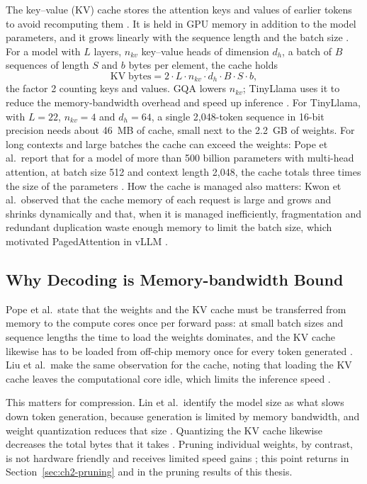 \documentclass[
11pt, %
english, %
singlespacing, %
headsepline, %
]{MastersDoctoralThesis} %
\begin{document}
The key--value (KV) cache stores the attention keys and values of earlier tokens to avoid recomputing them \cite{liu2024kivi}. It is held in GPU memory in addition to the model parameters, and it grows linearly with the sequence length and the batch size \cite{zhang2023h2o}. For a model with $L$ layers, $n_{kv}$ key--value heads of dimension $d_h$, a batch of $B$ sequences of length $S$ and $b$ bytes per element, the cache holds
\begin{equation}
  \mathrm{KV\;bytes} = 2 \cdot L \cdot n_{kv} \cdot d_h \cdot B \cdot S \cdot b,
  \label{eq:ch2-kvsize}
\end{equation}
the factor 2 counting keys and values. GQA lowers $n_{kv}$; TinyLlama uses it to reduce the memory-bandwidth overhead and speed up inference \cite{zhang2024tinyllama}. For TinyLlama, with $L = 22$, $n_{kv} = 4$ and $d_h = 64$, a single 2{,}048-token sequence in 16-bit precision needs about 46~MB of cache, small next to the 2.2~GB of weights. For long contexts and large batches the cache can exceed the weights: Pope et al.\ report that for a model of more than 500 billion parameters with multi-head attention, at batch size 512 and context length 2{,}048, the cache totals three times the size of the parameters \cite{pope2023efficiently}. How the cache is managed also matters: Kwon et al.\ observed that the cache memory of each request is large and grows and shrinks dynamically and that, when it is managed inefficiently, fragmentation and redundant duplication waste enough memory to limit the batch size, which motivated PagedAttention in vLLM \cite{kwon2023vllm}.

\subsection{Why Decoding is Memory-bandwidth Bound}
\label{sec:ch2-roofline}

Pope et al.\ state that the weights and the KV cache must be transferred from memory to the compute cores once per forward pass: at small batch sizes and sequence lengths the time to load the weights dominates, and the KV cache likewise has to be loaded from off-chip memory once for every token generated \cite{pope2023efficiently}. Liu et al.\ make the same observation for the cache, noting that loading the KV cache leaves the computational core idle, which limits the inference speed \cite{liu2024kivi}.

This matters for compression. Lin et al.\ identify the model size as what slows down token generation, because generation is limited by memory bandwidth, and weight quantization reduces that size \cite{lin2024awq}. Quantizing the KV cache likewise decreases the total bytes that it takes \cite{liu2024kivi}. Pruning individual weights, by contrast, is not hardware friendly and receives limited speed gains \cite{zhou2021nm}; this point returns in Section~\ref{sec:ch2-pruning} and in the pruning results of this thesis.
\end{document}
